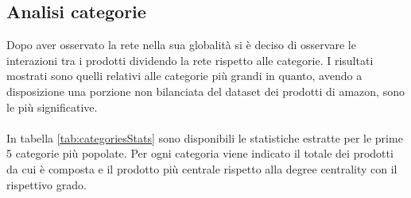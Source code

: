 \subsection{Analisi categorie}
Dopo aver osservato la rete nella sua globalità si è deciso di osservare le interazioni tra i prodotti dividendo la rete rispetto alle categorie. I risultati mostrati sono quelli relativi alle categorie più grandi in quanto, avendo a disposizione una porzione non bilanciata del dataset dei prodotti di amazon, sono le più significative. 
\\\\
In tabella \ref{tab:categoriesStats} sono disponibili le statistiche estratte per le prime 5 categorie più popolate. Per ogni categoria viene indicato il totale dei prodotti da cui è composta e il prodotto più centrale rispetto alla degree centrality con il rispettivo grado. \\\\

